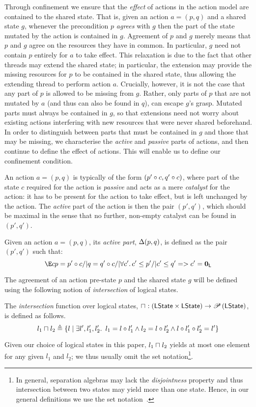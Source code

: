 Through confinement we ensure that the \emph{effect} of actions in the action model are contained to the shared state. That is, given an action $a = (p,q)$ and a shared state $g$, whenever the precondition $p$ \emph{agrees} with $g$ then the part of the state mutated by the action is contained in $g$. 
Agreement of $p$ and $g$ merely means that $p$ and $g$ agree on the resources they have in common. 
In particular, $g$ need not contain $p$ entirely for $a$ to take effect. This relaxation is due to the fact that other threads may extend the shared state; in particular, the extension may provide the missing resources for $p$ to be contained in the shared state, thus allowing the extending thread to perform action $a$. Crucially, however, it is not the case that any part of $p$ is allowed to be missing from $g$. Rather, only parts of $p$ that are not mutated by $a$ (and thus can also be found in $q$), can escape $g$'s grasp. Mutated parts must always be contained in $g$, so that extensions need not worry about existing actions interfering with new resources that were never shared beforehand. In order to distinguish between parts that must be contained in $g$ and those that may be missing, we characterise the \emph{active} and \emph{passive} parts of actions, and then continue to define the effect of actions. This will enable us to define our confinement condition.

An action $a = (p, q)$ is typically of the form $(p' \circ c, q' \circ c)$, where part of the state $c$ required for the action is \emph{passive} and acts as a mere \emph{catalyst} for the action: it has to be present for the action to take effect, but is left unchanged by the action. The \emph{active} part of the action is then the pair $(p',q')$, which should be maximal in the sense that no further, non-empty catalyst can be found in $(p',q')$.
%
%
\begin{definition}
Given an action $a = (p, q)$, its \emph{active part}, $\Delta {(p,q)}$, is defined as the pair $(p', q')$ such that:
%
\[
	\E c p = p' \composeL c /| q = q' \composeL c /| \V{c'} c'\leq p' /|
  c'\leq q' => c' = \unitL
\]
%
\end{definition}
%
%
%
The agreement of an action pre-state $p$ and the shared state $g$ will be defined using the following notion of \emph{intersection} of logical states.
%
%
\begin{definition}[Intersection]
The \emph{intersection} function over logical states,
$
\sqcap_{} : \left(\mathsf{LState} \times \mathsf{LState} \right) \rightarrow \mathscr{P}\left(\mathsf{LState} \right)
$, is defined as follows.
%
\[
	l_1 \sqcap_{} l_2 \triangleq 
	\left\{ 
		l  \mid
		\exists l', l_1', l_2'.\,\ l_1 = l \circ l_1' \land l_2 = l \circ l_2' \land l \circ l_1' \circ l_2' = l'
	\right\}
\]
%
\end{definition}
%
Given our choice of logical states in this paper, $l_1\sqcap_{} l_2$ yields at most one element for any given $l_1$ and $l_2$; we thus usually omit the set notation\footnote{In general, separation algebras may lack the \emph{disjointness} property and thus intersection between two states may yield more than one state. Hence, in our general definitions we use the set notation~\cite{colosl-tr14}.}.

